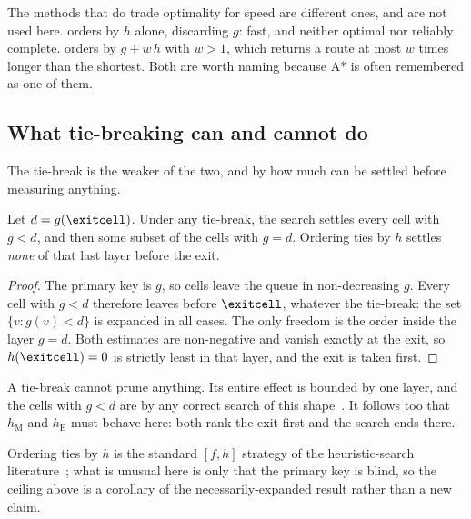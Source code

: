 The methods that do trade optimality for speed are different ones, and are not
used here.  orders by $h$ alone, discarding
$g$: fast, and neither optimal nor reliably complete. 
orders by $g+w\,h$ with $w>1$, which returns a route at most $w$ times longer
than the shortest. Both are worth naming because A* is often remembered as one
of them.

\subsection{What tie-breaking can and cannot do}

The tie-break is the weaker of the two, and by how much can be settled before
measuring anything.

\begin{proposition}
\label{prop:tiebreak-ceiling}
Let $d=g(\exitcell)$. Under any tie-break, the search settles every cell with
$g<d$, and then some subset of the cells with $g=d$. Ordering ties by $h$
settles \emph{none} of that last layer before the exit.
\end{proposition}

\begin{proof}
The primary key is $g$, so cells leave the queue in non-decreasing $g$. Every
cell with $g<d$ therefore leaves before $\exitcell$, whatever the tie-break: the
set $\{v: g(v)<d\}$ is expanded in all cases. The only freedom is the order
inside the layer $g=d$. Both estimates are non-negative and vanish exactly at
the exit, so $h(\exitcell)=0$ is strictly least in that layer, and the exit is
taken first.
\end{proof}

\begin{keypoint}
A tie-break cannot prune anything. Its entire effect is bounded by one layer,
and the cells with $g<d$ are  by any correct
search of this shape~\cite{dechter1985generalized}. It follows too that
$h_{\mathrm{M}}$ and $h_{\mathrm{E}}$ must behave  here:
both rank the exit first and the search ends there.
\end{keypoint}

Ordering ties by $h$ is the standard $[f,h]$ strategy of the heuristic-search
literature~\cite{correa2018analyzing}; what is unusual here is only that the
primary key is blind, so the ceiling above is a corollary of the
necessarily-expanded result rather than a new claim.

